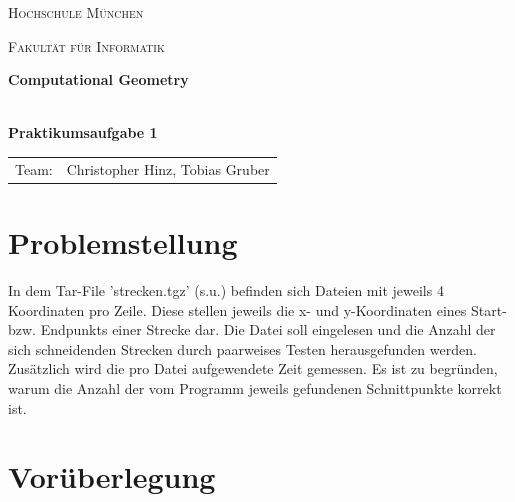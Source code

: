 \documentclass[12pt]{scrartcl}
\begin{document}
\begin{titlepage}
    \vfill
	\centering
	{\scshape\LARGE Hochschule München \par}
    {\scshape\Large Fakultät für Informatik \par}
	\vspace{1.5cm}




    \vfill
	{\LARGE\bfseries Computational Geometry\\~\\ \par}
	{\LARGE\bfseries Praktikumsaufgabe 1\par}
	\vfill
    \vfill


    \begin{tabular}{ll}
    \normalsize
    Team:  & Christopher Hinz, Tobias Gruber\\
    \end{tabular}

	\vfill

\end{titlepage}

\newpage



\raggedright


\section{Problemstellung}
In dem Tar-File 'strecken.tgz' (s.u.) befinden sich Dateien mit jeweils 4 Koordinaten pro Zeile.
Diese stellen jeweils die x- und y-Koordinaten eines Start- bzw. Endpunkts einer Strecke dar.
Die Datei soll eingelesen und die Anzahl der sich schneidenden Strecken durch paarweises Testen herausgefunden werden.
Zusätzlich wird die pro Datei aufgewendete Zeit gemessen.
Es ist zu begründen, warum die Anzahl der vom Programm jeweils gefundenen Schnittpunkte korrekt ist.

\section{Vorüberlegung}
\end{document}
